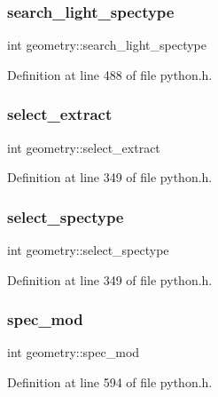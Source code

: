 \subsubsection{\texorpdfstring{search\+\_\+light\+\_\+spectype}{search\_light\_spectype}}
{\footnotesize\ttfamily int geometry\+::search\+\_\+light\+\_\+spectype}



Definition at line 488 of file python.\+h.

\mbox{\label{structgeometry_ab8605990f1d7f0862abaf18f1c701045}} 
\subsubsection{\texorpdfstring{select\+\_\+extract}{select\_extract}}
{\footnotesize\ttfamily int geometry\+::select\+\_\+extract}



Definition at line 349 of file python.\+h.

\mbox{\label{structgeometry_a384632d687a144af30856d0c8d96f01c}} 
\subsubsection{\texorpdfstring{select\+\_\+spectype}{select\_spectype}}
{\footnotesize\ttfamily int geometry\+::select\+\_\+spectype}



Definition at line 349 of file python.\+h.

\mbox{\label{structgeometry_aa78a12aa790f9ced5186cb492e117374}} 
\subsubsection{\texorpdfstring{spec\+\_\+mod}{spec\_mod}}
{\footnotesize\ttfamily int geometry\+::spec\+\_\+mod}



Definition at line 594 of file python.\+h.

